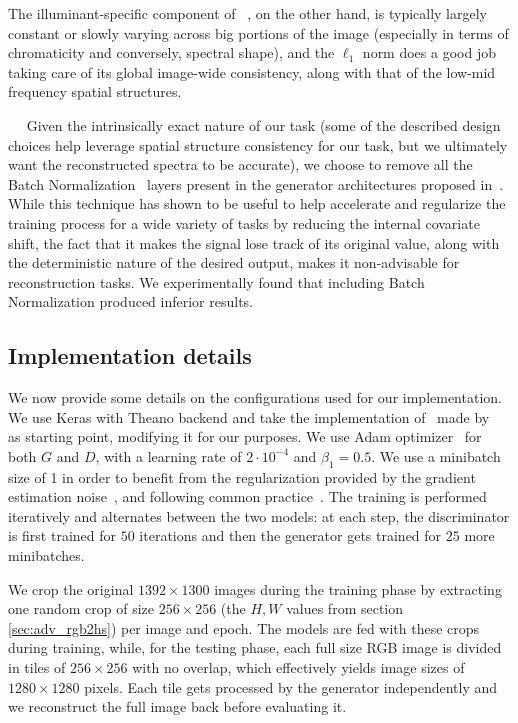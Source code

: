 \documentclass[10pt,twocolumn,letterpaper]{article}
\newcommand{\minisection}[1]{\vspace{0.04in} \noindent {\bf #1}\ \ }
\begin{document}
The illuminant-specific component of ~\cite{shafer_using_1985}, on the other hand, is typically largely constant or slowly varying across big portions of the image (especially in terms of chromaticity and conversely, spectral shape), and the $\ell_1$ norm does a good job taking care of its global image-wide consistency, along with that of the low-mid frequency spatial structures. 

\minisection{Avoiding Batch Normalization}
Given the intrinsically exact nature of our task (some of the described design choices help leverage spatial structure consistency for our task, but we ultimately want the reconstructed spectra to be accurate), we choose to remove all the Batch Normalization~\cite{ioffe_batch_2015} layers present in the generator architectures proposed in~\cite{Isola_2017_CVPR}.
While this technique has shown to be useful to help accelerate and regularize the training process for a wide variety of tasks by reducing the internal covariate shift, the fact that it makes the signal lose track of its original value, along with the deterministic nature of the desired output, makes it non-advisable for reconstruction tasks. 
We experimentally found that including Batch Normalization produced inferior results.

\subsection{Implementation details}
\label{sec:implementation}
We now provide some details on the configurations used for our implementation. We use Keras with Theano backend and take the implementation of~\cite{Isola_2017_CVPR} made by~\cite{costa_towards_2017} as starting point, modifying it for our purposes.
We use Adam optimizer~\cite{kingma_adam:_2015} for both $G$ and $D$, with a learning rate of $2\cdot10^{-4}$ and $\beta_1=0.5$. We use a minibatch size of 1 in order to benefit from the regularization provided by the gradient estimation noise~\cite{keskar_large-batch_2017}, and following common practice~\cite{Isola_2017_CVPR}. The training is performed iteratively and alternates between the two models: at each step, the discriminator is first trained for $50$ iterations and then the generator gets trained for $25$ more minibatches.

We crop the original $1392\times 1300$ images during the training phase by extracting one random crop of size $256\times 256$ (the $H,W$ values from section \ref{sec:adv_rgb2hs}) per image and epoch.
The models are fed with these crops during training, while, for the testing phase, each full size RGB image is divided in tiles of $256\times256$ with no overlap, which effectively yields image sizes of $1280\times1280$ pixels.
Each tile gets processed by the generator independently and we reconstruct the full image back before evaluating it.
\end{document}
